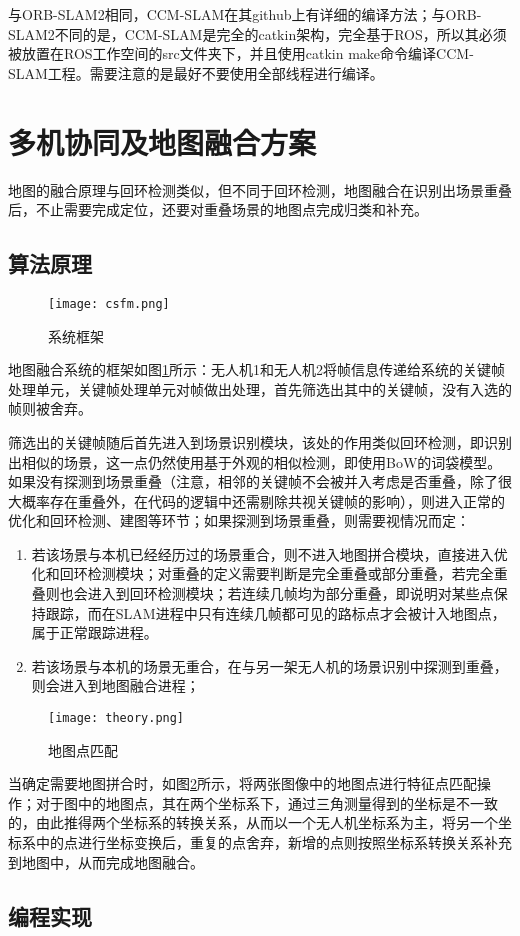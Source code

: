 与ORB-SLAM2相同，CCM-SLAM在其github上有详细的编译方法；与ORB-SLAM2不同的是，CCM-SLAM是完全的catkin架构，完全基于ROS，所以其必须被放置在ROS工作空间的src文件夹下，并且使用catkin make命令编译CCM-SLAM工程。需要注意的是最好不要使用全部线程进行编译。


\section{多机协同及地图融合方案}

地图的融合原理与回环检测类似，但不同于回环检测，地图融合在识别出场景重叠后，不止需要完成定位，还要对重叠场景的地图点完成归类和补充。

\subsection{算法原理} \label{3.4.1}

\begin{figure}[!ht]
	\centering
	\texttt{[image: csfm.png]}
	\caption{系统框架}
	\label{fig13}
\end{figure}

地图融合系统的框架如图\ref{fig13}所示：无人机1和无人机2将帧信息传递给系统的关键帧处理单元，关键帧处理单元对帧做出处理，首先筛选出其中的关键帧，没有入选的帧则被舍弃。

筛选出的关键帧随后首先进入到场景识别模块，该处的作用类似回环检测，即识别出相似的场景，这一点仍然使用基于外观的相似检测，即使用BoW的词袋模型。如果没有探测到场景重叠（注意，相邻的关键帧不会被并入考虑是否重叠，除了很大概率存在重叠外，在代码的逻辑中还需剔除共视关键帧的影响），则进入正常的优化和回环检测、建图等环节；如果探测到场景重叠，则需要视情况而定：

\begin{enumerate}
	\item 若该场景与本机已经经历过的场景重合，则不进入地图拼合模块，直接进入优化和回环检测模块；对重叠的定义需要判断是完全重叠或部分重叠，若完全重叠则也会进入到回环检测模块；若连续几帧均为部分重叠，即说明对某些点保持跟踪，而在SLAM进程中只有连续几帧都可见的路标点才会被计入地图点，属于正常跟踪进程。
	\item 若该场景与本机的场景无重合，在与另一架无人机的场景识别中探测到重叠，则会进入到地图融合进程；
\end{enumerate}

\begin{figure}[!ht]
	\centering
	\texttt{[image: theory.png]}
	\caption{地图点匹配}
	\label{fig14}
\end{figure}

当确定需要地图拼合时，如图\ref{fig14}所示，将两张图像中的地图点进行特征点匹配操作；对于图中的地图点，其在两个坐标系下，通过三角测量得到的坐标是不一致的，由此推得两个坐标系的转换关系，从而以一个无人机坐标系为主，将另一个坐标系中的点进行坐标变换后，重复的点舍弃，新增的点则按照坐标系转换关系补充到地图中，从而完成地图融合。


\subsection{编程实现} \label{3.4.2}









